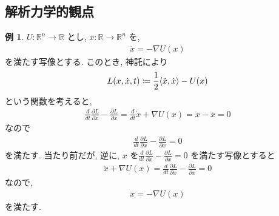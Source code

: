 \documentclass[10pt, fleqn, label-section=none]{bxjsarticle}
\theoremstyle{definition}
\newtheorem{ex}[dfn]{例}
\newcommand{\tbra}[1]{\mleft\langle#1\mright\rangle}
\renewcommand{\;}{\, ; \,}
\begin{document}
\subsection{解析力学的観点}

\begin{ex}

$U: \mathbb R^n \rightarrow \mathbb R$ とし, $x: \mathbb R \rightarrow \mathbb R^n$ を, 
\begin{align*} \ddot x = - \nabla U(x) \end{align*}
を満たす写像とする. このとき, 神託により
\begin{align*} L(x, \dot x , t) \coloneqq \frac{1}{2} \tbra{\dot x, \dot x} - U(x) \end{align*}
という関数を考えると, 
\begin{align*} \frac{d}{dt} \frac{\partial L}{\partial \dot x} - \frac{\partial L}{\partial x} = \frac{d}{dt}  \dot x + \nabla U (x) = \ddot x - \ddot x = 0 \end{align*}
なので
\begin{align*} \frac{d}{dt} \frac{\partial L}{\partial \dot x} - \frac{\partial L}{\partial x} = 0 \end{align*}
を満たす.
当たり前だが, 逆に, $x$ を$\frac{d}{dt} \frac{\partial L}{\partial \dot x} - \frac{\partial L}{\partial x} = 0$ を満たす写像とすると
\begin{align*} \ddot x + \nabla U (x) =  \frac{d}{dt} \frac{\partial L}{\partial \dot x} - \frac{\partial L}{\partial x}  = 0  \end{align*} 
なので, 
\begin{align*} \ddot x = - \nabla U(x) \end{align*}
を満たす.
\end{ex}
\end{document}
